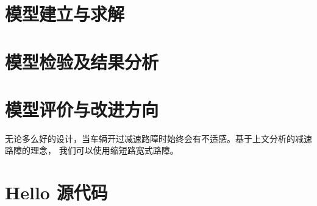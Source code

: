 \documentclass[withoutpreface,bwprint]{cumcmthesis}
\begin{document}
\section{模型建立与求解}

\section{模型检验及结果分析}

\section{模型评价与改进方向}
无论多么好的设计，当车辆开过减速路障时始终会有不适感。基于上文分析的减速路障的理念，
我们可以使用缩短路宽式路障。




\nocite{*}


\newpage
\appendix
\section{Hello 源代码}

\end{document}
